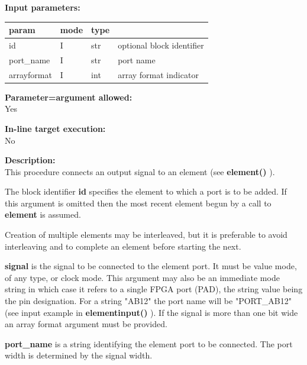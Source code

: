         {\bf Input parameters:} \\
        \begin{tabular}{| l | l | l | l |}
        \hline
        param  & mode     & type  & \\
        \hline \hline
        id          & I          & str & optional block identifier \\ \hline
        port\_name  & I          & str & port name                 \\ \hline
        arrayformat & I          & int & array format indicator    \\ \hline
        \end{tabular}
        
        {\bf Parameter=argument allowed:} \\
        Yes
        
        {\bf In-line target execution:} \\
        No
        
        {\bf Description:} \\
        This procedure connects an output signal to an element (see {\bf element()}
        ).
        
        The block identifier {\bf id} specifies the element to which a port is to
        be added. If this argument is omitted then the most recent
        element begun by a call to {\bf element} is assumed.
        
        Creation of multiple elements may be interleaved, but it is preferable to
        avoid interleaving and to complete an element before starting the next.
        
        {\bf signal} is the signal to be connected to the element port. It must be
        value mode, of any type, or clock mode. This argument may also be an
        immediate mode string in which case it refers to a single FPGA port (PAD),
        the string value being the pin designation. For a string "AB12" the port
        name will be "PORT\_AB12" (see input example in {\bf elementinput()}
        ). If the signal is more than one bit wide an
        array format argument must be provided.        
        
        {\bf port\_name} is a string identifying the element port to be
        connected. The port width is determined by the signal width.
        
